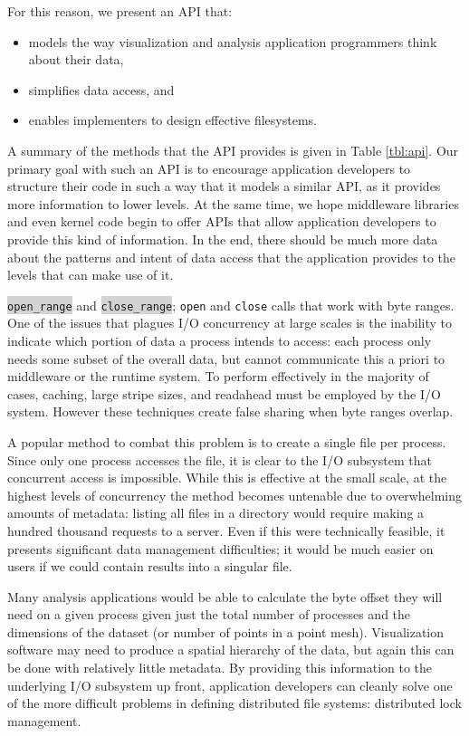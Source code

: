 For this reason, we present an API that:

\begin{itemize}
  \item models the way visualization and analysis application
  programmers think about their data,
  \item simplifies data access, and
  \item enables implementers to design effective filesystems.
\end{itemize}

A summary of the methods that the API provides is given in Table
\ref{tbl:api}.  Our primary goal with such an API is to encourage
application developers to structure their code in such a way that it
models a similar API, as it provides more information to lower levels.
At the same time, we hope middleware libraries and even kernel code
begin to offer APIs that allow application developers to provide this
kind of information.  In the end, there should be much more data about
the patterns and intent of data access that the application provides to
the levels that can make use of it.

\colorbox{lightgray}{\texttt{open\_range}} and
\colorbox{lightgray}{\texttt{close\_range}}; \verb!open! and \verb!close!
calls that work with byte ranges.
One of the issues that plagues I/O concurrency
at large scales is the inability to indicate which portion of data
a process intends to
access: each process only needs some subset of the overall data, but
cannot communicate this a priori to middleware or the runtime system.
To perform effectively in the majority of cases, caching, large stripe
sizes, and readahead must be employed by the I/O system.  However these
techniques create false sharing when byte ranges overlap.

A popular method to combat this problem is to create a single file per
process.  Since only one process accesses the file, it is clear to
the I/O subsystem that concurrent access is impossible.  While this
is effective at the small scale, at the highest levels of concurrency
the method becomes untenable due to overwhelming amounts of metadata:
listing all files in a directory would require making a hundred
thousand requests to a server.  Even if this were technically feasible,
it presents significant data management difficulties; it would be much
easier on users if we could contain results into a singular file.

Many analysis applications would be able to calculate the byte offset
they will need on a given process given just the total number of
processes and the dimensions of the dataset (or number of points in
a point mesh).  Visualization software may need to produce a spatial
hierarchy of the data, but again this can be done with relatively
little metadata.  By providing this information to the underlying
I/O subsystem up front, application developers can cleanly solve one
of the more difficult problems in defining distributed file systems:
distributed lock management.

